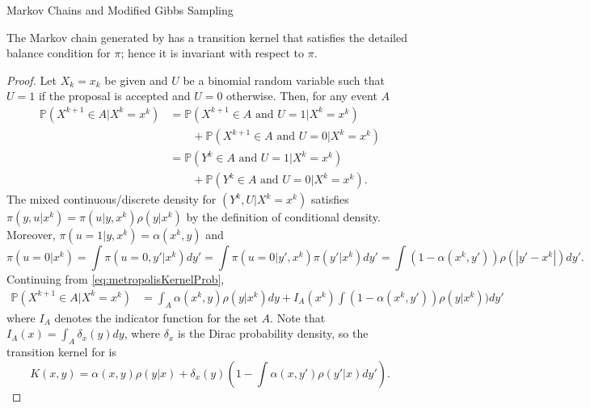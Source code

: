 \begin{chapter}{Markov Chains and Modified Gibbs Sampling}
\begin{prop} \label{prop:metropolisInvariance}
  The Markov chain generated by  has a transition kernel that satisfies the detailed balance condition for $\pi$; hence it is invariant with respect to $\pi$.
\end{prop}
\begin{proof}
Let $X_k=x_k$ be given and $U$ be a binomial random variable such that $U=1$ if the proposal is accepted and $U=0$ otherwise. 
Then, for any event $A$ 
\begin{align}
  \mathbb P\left( X^{k+1} \in A | X^k = x^k \right)
    &= \mathbb P\left( X^{k+1} \in A\text{ and } U = 1 |X^k=x^k \right) \nonumber\\
    &\quad\quad+ \mathbb P\left(X^{k+1} \in A\text{ and } U = 0| X^k=x^k \right) \nonumber \\
    &= \mathbb P\left( Y^k \in A\text{ and } U = 1 |X^k=x^k \right) \nonumber\\
    &\quad\quad+ \mathbb P\left(Y^k \in A\text{ and } U = 0| X^k=x^k \right). \label{eq:metropolisKernelProb}
\end{align}
The mixed continuous/discrete density for $(Y^k,U|X^k = x^k)$ satisfies $\pi(y,u|x^k) = \pi(u|y,x^k)\rho(y|x^k)$ by the definition of conditional density.  
Moreover, $\pi(u=1|y,x^k) = \alpha(x^k,y)$ and 
\begin{equation*}
  \pi(u=0|x^k) = \int \pi(u=0,y'|x^k)dy' = \int \pi(u=0|y',x^k)\pi(y'|x^k)dy' = \int (1-\alpha(x^k,y'))\rho(|y'-x^k|)dy'.
\end{equation*}
Continuing from \eqref{eq:metropolisKernelProb},
\begin{align}
  \mathbb P\left( X^{k+1} \in A | X^k = x^k \right)
    &= \int_A \alpha(x^k,y)\rho(y|x^k)dy + I_A(x^k) \int (1 - \alpha(x^k,y'))\rho(y|x^k))dy'
\end{align}
where $I_A$ denotes the indicator function for the set $A$.
Note that $I_A(x) = \int_A \delta_x(y)dy$, where $\delta_x$ is the Dirac probability density, so the transition kernel for  is
\begin{equation} \label{eq:metropolisKernel}
  K(x,y) = \alpha(x,y)\rho(y|x) + \delta_x(y) \left(1 - \int \alpha(x,y')\rho(y'|x)dy'\right).
\end{equation}


\end{proof}
\end{chapter}
